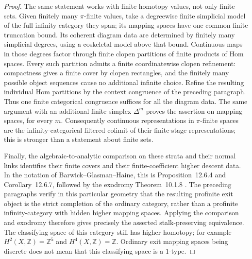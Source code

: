\begin{proof}
The same statement works with finite homotopy values, not only finite
sets. Given finitely many $\pi$-finite values, take a degreewise finite
simplicial model of the full infinity-category they span; its mapping
spaces have one common finite truncation bound. Its coherent diagram
data are determined by finitely many simplicial degrees, using a
coskeletal model above that bound. Continuous maps in those degrees
factor through finite clopen partitions of finite products of Hom
spaces. Every such partition admits a finite coordinatewise clopen
refinement: compactness gives a finite cover by clopen rectangles,
and the finitely many possible object sequences cause no additional
infinite choice. Refine the resulting individual Hom partitions by
the context congruence of the preceding paragraph. Thus one finite
categorical congruence suffices for all the diagram data.
The same argument with an additional finite simplex
$\Delta^m$ proves the assertion on mapping spaces, for every $m$.
Consequently continuous representations in $\pi$-finite spaces are the
infinity-categorical filtered colimit of their finite-stage
representations; this is stronger than a statement about finite sets.

Finally, the algebraic-to-analytic comparison on these strata and their
normal links identifies their finite covers and their finite-coefficient
higher descent data. In the notation of Barwick--Glasman--Haine, this
is Proposition~12.6.4 and Corollary~12.6.7, followed by the exodromy
Theorem~10.1.8 \citep{FA_BGH2020}. The preceding paragraphs verify in this
particular geometry that the resulting profinite exit object is the
strict completion of the ordinary category, rather than a profinite
infinity-category with hidden higher mapping spaces. Applying the
comparison and exodromy therefore gives precisely the asserted
stalk-preserving equivalence. The classifying space of this category
still has higher homotopy; for example $H^2(X,\mathbb Z)=\mathbb Z^5$
and $H^4(X,\mathbb Z)=\mathbb Z$. Ordinary exit mapping spaces being
discrete does not mean that this classifying space is a $1$-type.
\end{proof}

